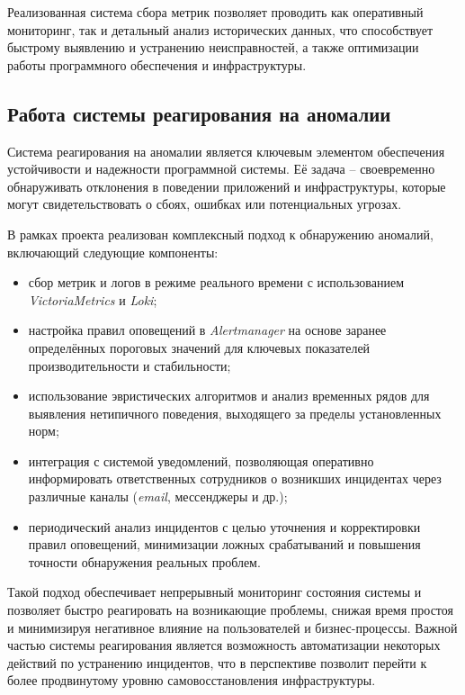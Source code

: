 Реализованная система сбора метрик позволяет проводить как оперативный мониторинг, так и детальный анализ исторических данных, что способствует быстрому выявлению и устранению неисправностей, а также оптимизации работы программного обеспечения и инфраструктуры.


\subsection{Работа системы реагирования на аномалии}

Система реагирования на аномалии является ключевым элементом обеспечения устойчивости и надежности программной системы. Её задача -- своевременно обнаруживать отклонения в поведении приложений и инфраструктуры, которые могут свидетельствовать о сбоях, ошибках или потенциальных угрозах.

В рамках проекта реализован комплексный подход к обнаружению аномалий, включающий следующие компоненты:

\begin{itemize}
    \item сбор метрик и логов в режиме реального времени с использованием \textit{VictoriaMetrics} и \textit{Loki};
    \item настройка правил оповещений в \textit{Alertmanager} на основе заранее определённых пороговых значений для ключевых показателей производительности и стабильности;
    \item использование эвристических алгоритмов и анализ временных рядов для выявления нетипичного поведения, выходящего за пределы установленных норм;
    \item интеграция с системой уведомлений, позволяющая оперативно информировать ответственных сотрудников о возникших инцидентах через различные каналы (\textit{email}, мессенджеры и др.);
    \item периодический анализ инцидентов с целью уточнения и корректировки правил оповещений, минимизации ложных срабатываний и повышения точности обнаружения реальных проблем.
\end{itemize}

Такой подход обеспечивает непрерывный мониторинг состояния системы и позволяет быстро реагировать на возникающие проблемы, снижая время простоя и минимизируя негативное влияние на пользователей и бизнес-процессы. Важной частью системы реагирования является возможность автоматизации некоторых действий по устранению инцидентов, что в перспективе позволит перейти к более продвинутому уровню самовосстановления инфраструктуры.

